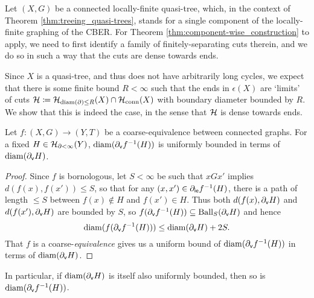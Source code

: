 \documentclass[reqno]{amsart}
\begin{document}
    Let $(X,G)$ be a connected locally-finite quasi-tree, which, in the context of Theorem \ref{thm:treeing_quasi-trees}, stands for a single component of the locally-finite graphing of the CBER. For Theorem \ref{thm:component-wise_construction} to apply, we need to first identify a family of finitely-separating cuts therein, and we do so in such a way that the cuts are dense towards ends.


    Since $X$ is a quasi-tree, and thus does not have arbitrarily long cycles, we expect that there is some finite bound $R<\infty$ such that the ends in $\epsilon(X)$ are `limits' of cuts $\mathcal{H}\coloneqq\mathcal{H}_{\operatorname{diam}(\partial)\leq R}(X)\cap\mathcal{H}_\mathrm{conn}(X)$ with boundary diameter bounded by $R$. We show that this is indeed the case, in the sense that $\mathcal{H}$ is dense towards ends.

    \begin{lemma}\label{lem:coarse_equivalence_controls_boundary_diameter}
        Let $f:(X,G)\to(Y,T)$ be a coarse-equivalence between connected graphs. For a fixed $H\in\mathcal{H}_{\partial<\infty}(Y)$, $\operatorname{diam}(\partial_\mathsf{v}f^{-1}(H))$ is uniformly bounded in terms of $\operatorname{diam}(\partial_\mathsf{v}H)$.
    \end{lemma}
    \begin{proof}
        Since $f$ is bornologous, let $S<\infty$ be such that $xGx'$ implies $d(f(x),f(x'))\leq S$, so that for any $(x,x')\in\partial_\mathsf{ie}f^{-1}(H)$, there is a path of length $\leq S$ between $f(x)\not\in H$ and $f(x')\in H$. Thus both $d(f(x),\partial_\mathsf{v}H)$ and $d(f(x'),\partial_\mathsf{v}H)$ are bounded by $S$, so $f(\partial_\mathsf{v}f^{-1}(H))\subseteq\operatorname{Ball}_S(\partial_\mathsf{v}H)$ and hence
        \begin{equation*}
            \operatorname{diam}(f(\partial_\mathsf{v}f^{-1}(H)))\leq\operatorname{diam}(\partial_\mathsf{v}H)+2S.
        \end{equation*}
        That $f$ is a coarse-\textit{equivalence} gives us a uniform bound of $\operatorname{diam}(\partial_\mathsf{v}f^{-1}(H))$ in terms of $\operatorname{diam}(\partial_\mathsf{v}H)$.
    \end{proof}

    In particular, if $\operatorname{diam}(\partial_\mathsf{v}H)$ is itself also uniformly bounded, then so is $\operatorname{diam}(\partial_\mathsf{v}f^{-1}(H))$.
\end{document}
